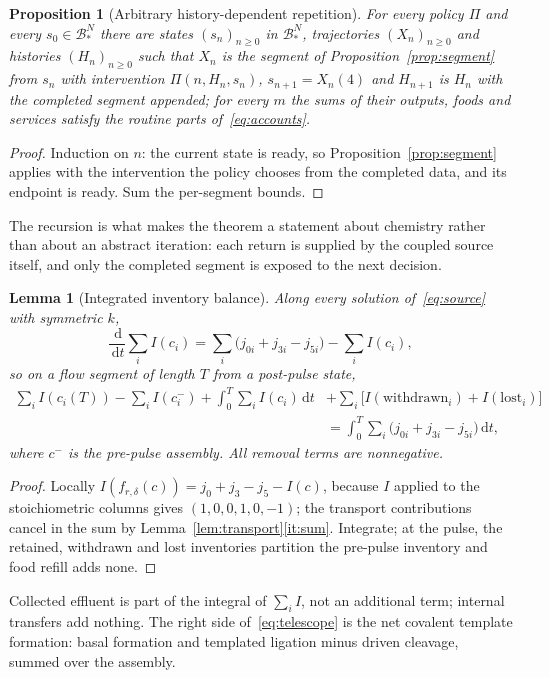 \documentclass[11pt,a4paper]{article}
\theoremstyle{plain}
\newtheorem{proposition}[theorem]{Proposition}
\newtheorem{lemma}[theorem]{Lemma}
\theoremstyle{definition}
\theoremstyle{remark}
\newcommand{\dd}{\,\mathrm d}
\newcommand{\Bstar}{\mathcal B_*}
\newcommand{\Iv}{I}
\begin{document}
\begin{proposition}[Arbitrary history-dependent repetition]\label{prop:recursion}
For every policy $\Pi$ and every $s_0\in\Bstar^N$ there are states $(s_n)_{n\ge0}$ in $\Bstar^N$, trajectories $(X_n)_{n\ge0}$ and histories $(H_n)_{n\ge0}$ such that $X_n$ is the segment of Proposition~\ref{prop:segment} from $s_n$ with intervention $\Pi(n,H_n,s_n)$, $s_{n+1}=X_n(4)$ and $H_{n+1}$ is $H_n$ with the completed segment appended; for every $m$ the sums of their outputs, foods and services satisfy the routine parts of~\eqref{eq:accounts}.
\end{proposition}
\begin{proof}
Induction on $n$: the current state is ready, so Proposition~\ref{prop:segment} applies with the intervention the policy chooses from the completed data, and its endpoint is ready. Sum the per-segment bounds.
\end{proof}
The recursion is what makes the theorem a statement about chemistry rather than about an abstract iteration: each return is supplied by the coupled source itself, and only the completed segment is exposed to the next decision.

\begin{lemma}[Integrated inventory balance]\label{lem:inventory}
Along every solution of~\eqref{eq:source} with symmetric $k$,
\begin{equation}\label{eq:inventoryrate}
\frac{\dd}{\dd t}\sum_i\Iv(c_i)=\sum_i\bigl(j_{0i}+j_{3i}-j_{5i}\bigr)-\sum_i\Iv(c_i),
\end{equation}
so on a flow segment of length $T$ from a post-pulse state,
\begin{equation}\label{eq:telescope}
\begin{split}
\sum_i\Iv(c_i(T))-\sum_i\Iv(c_i^-)+\int_0^T\sum_i\Iv(c_i)\dd t&+\sum_i\bigl[\Iv(\text{withdrawn}_i)+\Iv(\text{lost}_i)\bigr]\\
&=\int_0^T\sum_i\bigl(j_{0i}+j_{3i}-j_{5i}\bigr)\dd t,
\end{split}
\end{equation}
where $c^-$ is the pre-pulse assembly. All removal terms are nonnegative.
\end{lemma}
\begin{proof}
Locally $\Iv(f_{r,\delta}(c))=j_0+j_3-j_5-\Iv(c)$, because $\Iv$ applied to the stoichiometric columns gives $(1,0,0,1,0,-1)$; the transport contributions cancel in the sum by Lemma~\ref{lem:transport}\ref{it:sum}. Integrate; at the pulse, the retained, withdrawn and lost inventories partition the pre-pulse inventory and food refill adds none.
\end{proof}
Collected effluent is part of the integral of $\sum_i\Iv$, not an additional term; internal transfers add nothing. The right side of~\eqref{eq:telescope} is the net covalent template formation: basal formation and templated ligation minus driven cleavage, summed over the assembly.
\end{document}
